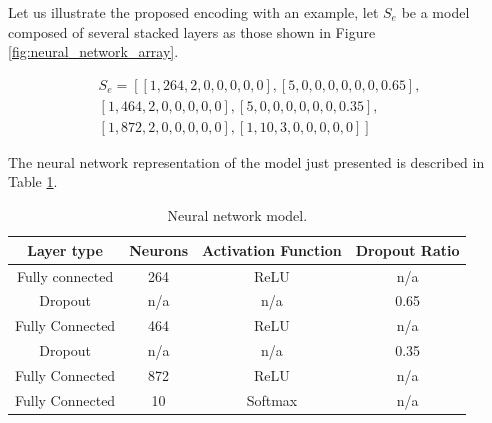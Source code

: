\documentclass[journal]{IEEEtran}
\begin{document}

Let us illustrate the proposed encoding with an example, let $S_e$ be a model composed of several stacked layers as those shown in Figure \ref{fig:neural_network_array}.

\begin{align*}
S_e = \left[ \left[1, 264, 2, 0, 0, 0, 0, 0 \right], \left[5, 0, 0, 0, 0, 0, 0, 0.65 \right], \right. \\
\left. \left[1, 464, 2, 0, 0, 0, 0, 0 \right], \left[5, 0, 0, 0, 0, 0, 0, 0.35 \right], \right. \\
\left. \left[1, 872, 2, 0, 0, 0, 0, 0 \right], \left[1, 10, 3, 0, 0, 0, 0, 0 \right] \right]
\end{align*}


The neural network representation of the model just presented is described in Table \ref{table:neural_network_model}. \\

\begin{table}[!htb]
\begin{center}
\begin{tabular}{| c | c | c | c |}
\hline
Layer type & Neurons & Activation Function & Dropout Ratio \\
\hline
Fully connected & 264 & ReLU & n/a \\
Dropout & n/a & n/a & 0.65 \\
Fully Connected & 464 & ReLU & n/a\\
Dropout & n/a & n/a & 0.35\\
Fully Connected & 872 & ReLU & n/a\\
Fully Connected & 10 & Softmax & n/a\\
\hline
\end{tabular}
\end{center}
\caption{Neural network model.}
\label{table:neural_network_model}
\end{table}
\end{document}
